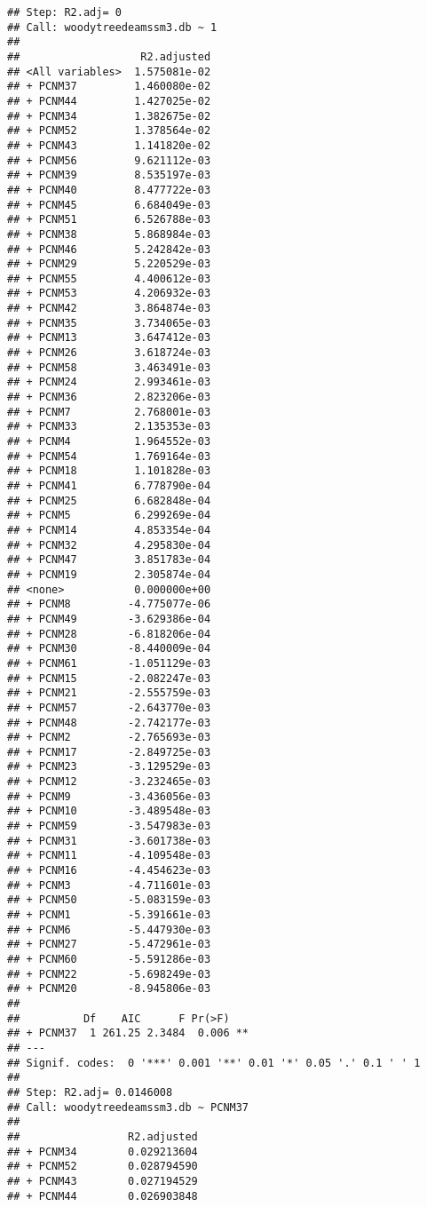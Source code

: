 \documentclass[
]{article}
\begin{document}
\begin{verbatim}
## Step: R2.adj= 0 
## Call: woodytreedeamssm3.db ~ 1 
##  
##                   R2.adjusted
## <All variables>  1.575081e-02
## + PCNM37         1.460080e-02
## + PCNM44         1.427025e-02
## + PCNM34         1.382675e-02
## + PCNM52         1.378564e-02
## + PCNM43         1.141820e-02
## + PCNM56         9.621112e-03
## + PCNM39         8.535197e-03
## + PCNM40         8.477722e-03
## + PCNM45         6.684049e-03
## + PCNM51         6.526788e-03
## + PCNM38         5.868984e-03
## + PCNM46         5.242842e-03
## + PCNM29         5.220529e-03
## + PCNM55         4.400612e-03
## + PCNM53         4.206932e-03
## + PCNM42         3.864874e-03
## + PCNM35         3.734065e-03
## + PCNM13         3.647412e-03
## + PCNM26         3.618724e-03
## + PCNM58         3.463491e-03
## + PCNM24         2.993461e-03
## + PCNM36         2.823206e-03
## + PCNM7          2.768001e-03
## + PCNM33         2.135353e-03
## + PCNM4          1.964552e-03
## + PCNM54         1.769164e-03
## + PCNM18         1.101828e-03
## + PCNM41         6.778790e-04
## + PCNM25         6.682848e-04
## + PCNM5          6.299269e-04
## + PCNM14         4.853354e-04
## + PCNM32         4.295830e-04
## + PCNM47         3.851783e-04
## + PCNM19         2.305874e-04
## <none>           0.000000e+00
## + PCNM8         -4.775077e-06
## + PCNM49        -3.629386e-04
## + PCNM28        -6.818206e-04
## + PCNM30        -8.440009e-04
## + PCNM61        -1.051129e-03
## + PCNM15        -2.082247e-03
## + PCNM21        -2.555759e-03
## + PCNM57        -2.643770e-03
## + PCNM48        -2.742177e-03
## + PCNM2         -2.765693e-03
## + PCNM17        -2.849725e-03
## + PCNM23        -3.129529e-03
## + PCNM12        -3.232465e-03
## + PCNM9         -3.436056e-03
## + PCNM10        -3.489548e-03
## + PCNM59        -3.547983e-03
## + PCNM31        -3.601738e-03
## + PCNM11        -4.109548e-03
## + PCNM16        -4.454623e-03
## + PCNM3         -4.711601e-03
## + PCNM50        -5.083159e-03
## + PCNM1         -5.391661e-03
## + PCNM6         -5.447930e-03
## + PCNM27        -5.472961e-03
## + PCNM60        -5.591286e-03
## + PCNM22        -5.698249e-03
## + PCNM20        -8.945806e-03
## 
##          Df    AIC      F Pr(>F)   
## + PCNM37  1 261.25 2.3484  0.006 **
## ---
## Signif. codes:  0 '***' 0.001 '**' 0.01 '*' 0.05 '.' 0.1 ' ' 1
## 
## Step: R2.adj= 0.0146008 
## Call: woodytreedeamssm3.db ~ PCNM37 
##  
##                 R2.adjusted
## + PCNM34        0.029213604
## + PCNM52        0.028794590
## + PCNM43        0.027194529
## + PCNM44        0.026903848

\end{verbatim}
\end{document}
